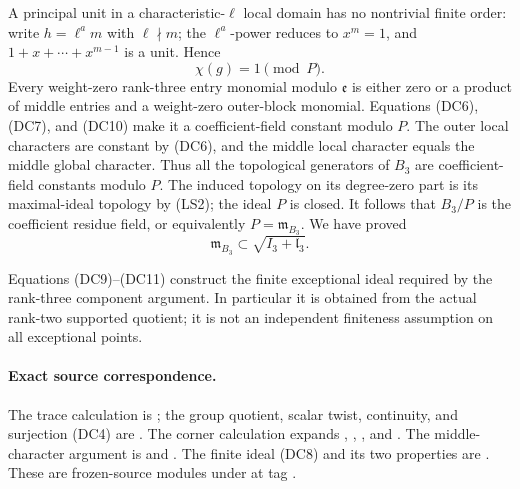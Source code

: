 A principal unit in a characteristic-\(\ell\)
local domain has no nontrivial finite
order: write \(h=\ell^a m\) with
\(\ell\nmid m\); the \(\ell^a\)-power
reduces to \(x^m=1\), and
\(1+x+\cdots+x^{m-1}\) is a unit.
Hence
\[
                              \chi(g)=1\pmod P.              \tag{DC10}
\]
Every weight-zero rank-three entry monomial
modulo \(\mathfrak e\) is either zero or
a product of middle entries and a
weight-zero outer-block monomial.
Equations (DC6), (DC7), and (DC10) make
it a coefficient-field constant modulo
\(P\).
The outer local characters are constant
by (DC6), and the middle local character
equals the middle global character.
Thus all the topological generators of
\(B_3\) are coefficient-field constants
modulo \(P\).
The induced topology on its degree-zero
part is its maximal-ideal topology by
(LS2); the ideal \(P\) is closed.
It follows that \(B_3/P\) is the
coefficient residue field, or equivalently
\(P=\mathfrak m_{B_3}\).
We have proved
\[
 \mathfrak m_{B_3}\subset
                     \sqrt{I_3+\mathfrak l_3}.               \tag{DC11}
\]

Equations (DC9)--(DC11) construct the
finite exceptional ideal required by
the rank-three component argument.
In particular it is obtained from
the actual rank-two supported quotient;
it is not an independent finiteness
assumption on all exceptional points.

\paragraph{Exact source correspondence.}
The trace calculation is
;
the group quotient, scalar twist, continuity,
and surjection (DC4) are
.
The corner calculation expands
,
,
, and
.
The middle-character argument is
 and
.
The finite ideal (DC8) and its two
properties are
.
These are frozen-source modules under
at tag .
